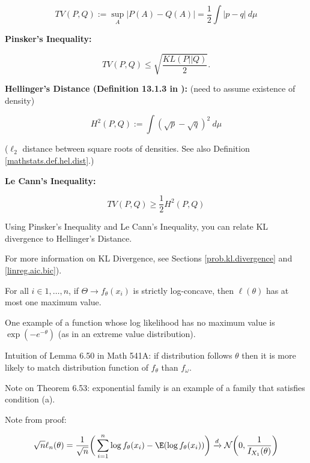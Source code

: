 \begin{remark}
\begin{enumerate}
\[
TV(P, Q) := \sup_{A} | P(A) - Q(A)| = \frac{1}{2} \int |p - q| \ d \mu
\]

\textbf{Pinsker's Inequality:}

\[
TV(P, Q) \leq \sqrt{ \frac{KL (P || Q)}{2}}.
\]

\textbf{Hellinger's Distance (Definition 13.1.3 in \citet{lehmann2005testing}):} (need to assume existence of density)

\[
H^2(P,Q) :=  \int ( \sqrt{p} - \sqrt{q} )^2 \ d \mu
\]

(\(\ell_2\) distance between square roots of densities. See also Definition \ref{mathstats.def.hel.dist}.)

\textbf{Le Cann's Inequality:}

\[
TV(P, Q) \geq \frac{1}{2} H^2(P, Q)
\]

Using Pinsker's Inequality and Le Cann's Inequality, you can relate KL divergence to Hellinger's Distance.

\end{enumerate}

For more information on KL Divergence, see Sections \ref{prob.kl.divergence} and \ref{linreg.aic.bic}).

\end{remark}

\begin{proposition} For all \(i \in 1, \ldots, n\), if \(\Theta \to f_\theta(x_i)\) is strictly log-concave, then \(\ell(\theta)\) has at most one maximum value.

\end{proposition}

\begin{remark}One example of a function whose log likelihood has no maximum value is \(\exp(-e^{-\theta})\) (as in an extreme value distribution). 

\end{remark}

\begin{remark} Intuition of Lemma 6.50 in Math 541A: if distribution follows \(\theta\) then it is more likely to match distribution function of \(f_\theta\) than \(f_\omega\).

\end{remark}

Note on Theorem 6.53: exponential family is an example of a family that satisfies condition (a).

Note from proof:

\[
\sqrt{n}\ell_n(\theta) = \frac{1}{\sqrt{n}} \bigg( \sum_{i=1}^n \log f_\theta(x_i) -  \E( \log f_\theta(x_i) ) \bigg) \xrightarrow{d} \mathcal{N} \bigg (0, \frac{1}{I_{X_1}(\theta)} \bigg)
\]

